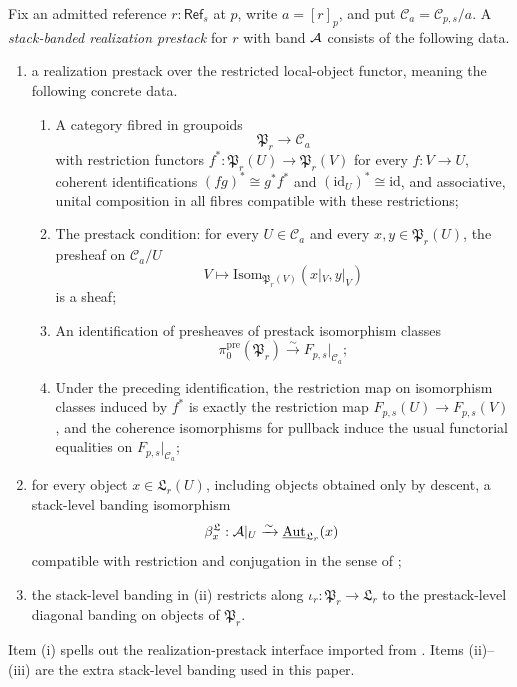 \begin{definition}\label{def:realization-prestack}
Fix an admitted reference $r:\mathsf{Ref}_s$ at $p$, write $a=[r]_p$, and put
$\mathcal C_a=\mathcal C_{p,s}/a$. A \emph{stack-banded realization prestack}
for $r$ with band $\mathcal{A}$ consists of the following data.
\begin{enumerate}[label=(\roman*),nosep]
\item a realization prestack over the restricted local-object functor, meaning
the following concrete data.
\begin{enumerate}[label=(\alph*),nosep]
\item A category fibred in groupoids
\[
\mathfrak P_r\longrightarrow \mathcal C_a
\]
with restriction functors $f^*:\mathfrak P_r(U)\to\mathfrak P_r(V)$ for every
$f:V\to U$, coherent identifications $(fg)^*\cong g^*f^*$ and
$(\mathrm{id}_U)^*\cong\mathrm{id}$, and associative, unital composition in all
fibres compatible with these restrictions;
\item The prestack condition: for every $U\in\mathcal C_a$ and every
$x,y\in\mathfrak P_r(U)$, the presheaf on $\mathcal C_a/U$
\[
V\longmapsto
\mathrm{Isom}_{\mathfrak P_r(V)}(x|_V,y|_V)
\]
is a sheaf;
\item An identification of presheaves of prestack isomorphism classes
\[
\pi_0^{\mathrm{pre}}(\mathfrak P_r)\xrightarrow{\sim}
F_{p,s}|_{\mathcal C_a};
\]
\item Under the preceding identification, the restriction map on isomorphism
classes induced by $f^*$ is exactly the restriction map
$F_{p,s}(U)\to F_{p,s}(V)$, and the coherence isomorphisms for pullback induce
the usual functorial equalities on $F_{p,s}|_{\mathcal C_a}$;
\end{enumerate}
\item for every object $x\in\mathfrak L_r(U)$, including objects obtained only
by descent, a stack-level banding isomorphism
\[
\beta^{\mathfrak L}_x:\mathcal{A}|_U\xrightarrow{\sim}
\underline{\mathrm{Aut}}_{\mathfrak L_r}(x)
\]
compatible with restriction and conjugation in the sense of
;
\item the stack-level banding in \textup{(ii)} restricts along
$\iota_r:\mathfrak P_r\to\mathfrak L_r$ to the prestack-level diagonal banding
on objects of $\mathfrak P_r$.
\end{enumerate}
Item \textup{(i)} spells out the realization-prestack interface imported from
\cite[Definition~4.11]{HomologicalVisibilityGluingObstructions2026}. Items
\textup{(ii)--(iii)} are the extra stack-level banding used in this paper.
\end{definition}

